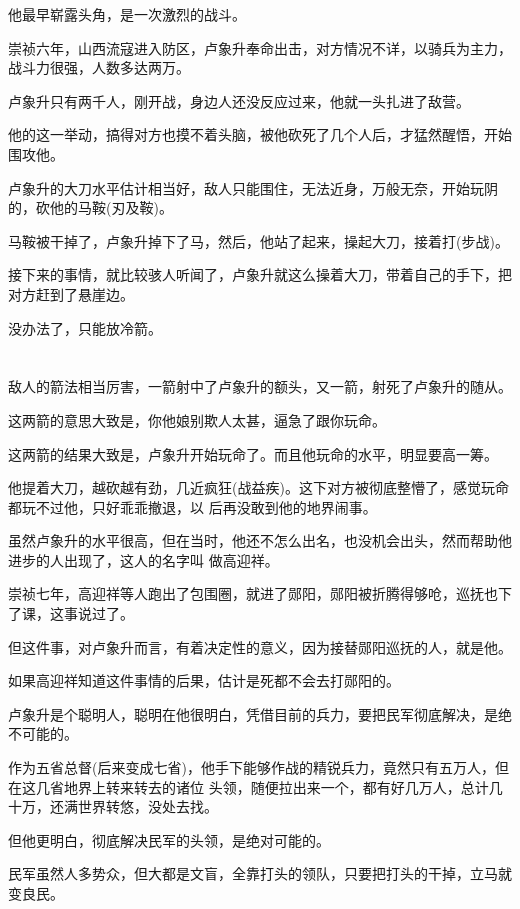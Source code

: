 \documentclass[11pt,a4paper,onecolumn]{article}
\begin{document}
他最早崭露头角，是一次激烈的战斗。

崇祯六年，山西流寇进入防区，卢象升奉命出击，对方情况不详，以骑兵为主力，战斗力很强，人数多达两万。

卢象升只有两千人，刚开战，身边人还没反应过来，他就一头扎进了敌营。

他的这一举动，搞得对方也摸不着头脑，被他砍死了几个人后，才猛然醒悟，开始围攻他。

卢象升的大刀水平估计相当好，敌人只能围住，无法近身，万般无奈，开始玩阴的，砍他的马鞍(刃及鞍)。

马鞍被干掉了，卢象升掉下了马，然后，他站了起来，操起大刀，接着打(步战)。

接下来的事情，就比较骇人听闻了，卢象升就这么操着大刀，带着自己的手下，把对方赶到了悬崖边。

没办法了，只能放冷箭。

\section[\thesection]{}

敌人的箭法相当厉害，一箭射中了卢象升的额头，又一箭，射死了卢象升的随从。

这两箭的意思大致是，你他娘别欺人太甚，逼急了跟你玩命。

这两箭的结果大致是，卢象升开始玩命了。而且他玩命的水平，明显要高一筹。

他提着大刀，越砍越有劲，几近疯狂(战益疾)。这下对方被彻底整懵了，感觉玩命都玩不过他，只好乖乖撤退，以
后再没敢到他的地界闹事。

虽然卢象升的水平很高，但在当时，他还不怎么出名，也没机会出头，然而帮助他进步的人出现了，这人的名字叫
做高迎祥。

崇祯七年，高迎祥等人跑出了包围圈，就进了郧阳，郧阳被折腾得够呛，巡抚也下了课，这事说过了。

但这件事，对卢象升而言，有着决定性的意义，因为接替郧阳巡抚的人，就是他。

如果高迎祥知道这件事情的后果，估计是死都不会去打郧阳的。

卢象升是个聪明人，聪明在他很明白，凭借目前的兵力，要把民军彻底解决，是绝不可能的。

作为五省总督(后来变成七省)，他手下能够作战的精锐兵力，竟然只有五万人，但在这几省地界上转来转去的诸位
头领，随便拉出来一个，都有好几万人，总计几十万，还满世界转悠，没处去找。

但他更明白，彻底解决民军的头领，是绝对可能的。

民军虽然人多势众，但大都是文盲，全靠打头的领队，只要把打头的干掉，立马就变良民。
\end{document}
